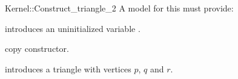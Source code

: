 \begin{ccRefFunctionObjectConcept}{Kernel::Construct_triangle_2}
A model for this must provide:


\ccHidden {}
             {introduces an uninitialized variable .}

\ccHidden {}
            {copy constructor.}


            {introduces a triangle  with vertices $p$,  $q$ and $r$.}

\end{ccRefFunctionObjectConcept}
